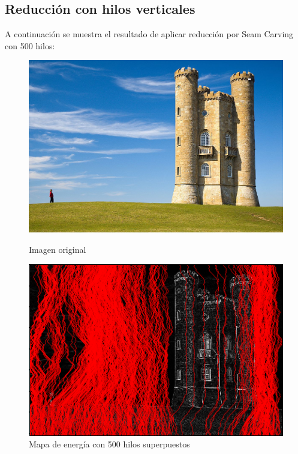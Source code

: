 \documentclass[12pt,a4paper,oneside]{article}
\begin{document}
\subsection{Reducción con hilos verticales}
A continuación se muestra el resultado de aplicar reducción por Seam Carving con 500 hilos:
\begin{figure}[!htb]
      \includegraphics[width=\linewidth]{Broadway_tower_edit.jpg}
      \caption{Imagen original}\label{broadwayorig}
    \endminipage\hfill
      \includegraphics[width=\linewidth]{500-reductionenergy.png}
      \caption{Mapa de energía con 500 hilos superpuestos}\label{broadwayenergy}
    \endminipage\hfill

\end{figure}
\end{document}
